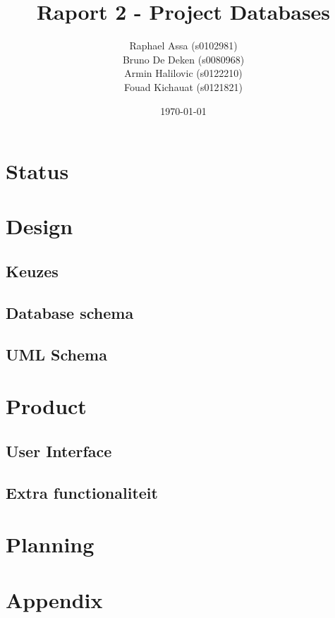 \documentclass[12pt]{article}
\title{Raport 2 - Project Databases}
\author{
    Raphael Assa (s0102981) \\
    Bruno De Deken (s0080968) \\
    Armin Halilovic (s0122210) \\
    Fouad Kichauat (s0121821) \\
}
\date{\today}
\begin{document}
\maketitle
\clearpage

\tableofcontents
\clearpage

\section{Status}

\clearpage

\section{Design}
\subsection{Keuzes}

\subsection{Database schema}

\subsection{UML Schema}

\clearpage

\section{Product}
\subsection{User Interface}

\subsection{Extra functionaliteit}

\clearpage

\section{Planning}

\clearpage

\section{Appendix}

\clearpage
\end{document}
